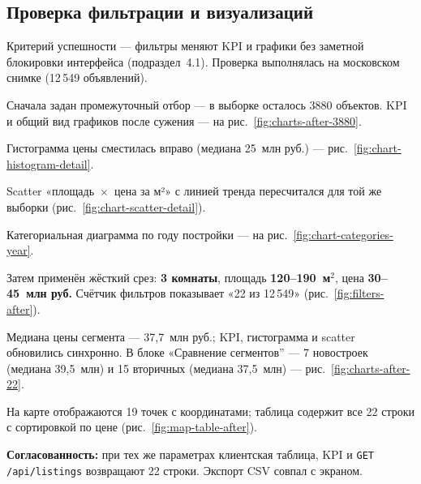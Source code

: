 
\subsection{Проверка фильтрации и визуализаций}
\label{sec:filter-test}

Критерий успешности --- фильтры меняют KPI и графики без заметной блокировки интерфейса (подраздел~4.1). Проверка выполнялась на московском снимке (12\,549 объявлений).

Сначала задан промежуточный отбор --- в выборке осталось 3880 объектов. KPI и общий вид графиков после сужения --- на рис.~\ref{fig:charts-after-3880}.


Гистограмма цены сместилась вправо (медиана 25~млн руб.) --- рис.~\ref{fig:chart-histogram-detail}.


Scatter «площадь~$\times$~цена за м²» с линией тренда пересчитался для той же выборки (рис.~\ref{fig:chart-scatter-detail}).


Категориальная диаграмма по году постройки --- на рис.~\ref{fig:chart-categories-year}.


Затем применён жёсткий срез: \textbf{3 комнаты}, площадь \textbf{120--190~м$^2$}, цена \textbf{30--45~млн руб.} Счётчик фильтров показывает «22 из 12\,549» (рис.~\ref{fig:filters-after}).


Медиана цены сегмента --- 37,7~млн руб.; KPI, гистограмма и scatter обновились синхронно. В блоке «Сравнение сегментов'' --- 7 новостроек (медиана 39,5~млн) и 15 вторичных (медиана 37,5~млн) --- рис.~\ref{fig:charts-after-22}.


На карте отображаются 19 точек с координатами; таблица содержит все 22 строки с сортировкой по цене (рис.~\ref{fig:map-table-after}).


\textbf{Согласованность:} при тех же параметрах клиентская таблица, KPI и \texttt{GET /api/listings} возвращают 22 строки. Экспорт CSV совпал с экраном.
